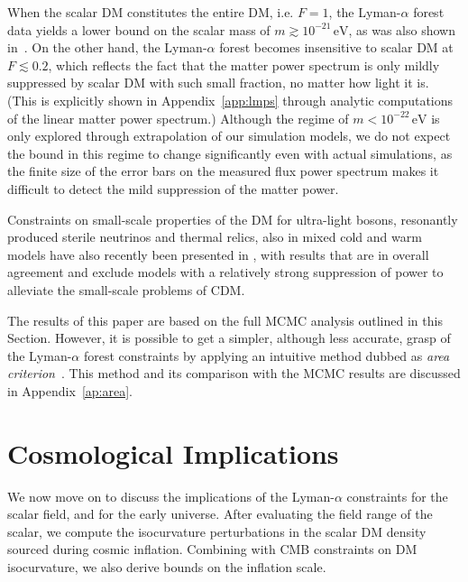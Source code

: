 \documentclass[11pt,nofootinbib]{article}
\numberwithin{equation}{section}
\begin{document}
When the scalar DM constitutes the entire DM, i.e. $F = 1$, the
Lyman-$\alpha$ forest data yields a lower bound on the scalar mass of $m
\gtrsim 10^{-21}\, \mathrm{eV}$, as was also shown
in~\cite{Irsic:2017yje}. On the other hand, the Lyman-$\alpha$ forest
becomes insensitive to scalar DM at $F \lesssim 0.2$,
which reflects the fact that the matter power spectrum is only mildly
suppressed by scalar DM with such small fraction, no matter how light it is.
(This is explicitly shown in Appendix~\ref{app:lmps}
through analytic computations of the linear matter power spectrum.)
Although the regime of $m < 10^{-22}\, \mathrm{eV}$ is only explored
through extrapolation of our simulation models, we do not expect the
bound in this regime to change significantly even with actual simulations,
as the finite size of the error bars on the measured flux
power spectrum makes it difficult to detect the mild suppression
of the matter power.

Constraints on small-scale properties of the DM for ultra-light bosons, resonantly produced sterile neutrinos and thermal relics,
also in mixed cold and warm models have also recently been presented in \cite{Armengaud:2017nkf,Irsic:2017ixq,Baur:2017stq}, with results
that are in overall agreement and exclude models with a relatively strong suppression of power to alleviate the small-scale problems of CDM.

The results of this paper are based on the full MCMC analysis outlined
in this Section. However, it is possible to get a simpler, although less accurate, grasp of the Lyman-$\alpha$ forest constraints by applying an intuitive method dubbed as \emph{area criterion}~\cite{Murgia:2017lwo}. This method 
and its comparison with the MCMC results are discussed in Appendix~\ref{ap:area}.



\section{Cosmological Implications}
\label{sec:cosmo}

We now move on to discuss the implications of the Lyman-$\alpha$
constraints for the scalar field, and for the early universe. 
After evaluating the field range of the scalar, we 
compute the isocurvature perturbations in the scalar DM
density sourced during cosmic inflation.
Combining with CMB constraints on DM isocurvature,
we also derive bounds on the inflation scale. 
\end{document}
